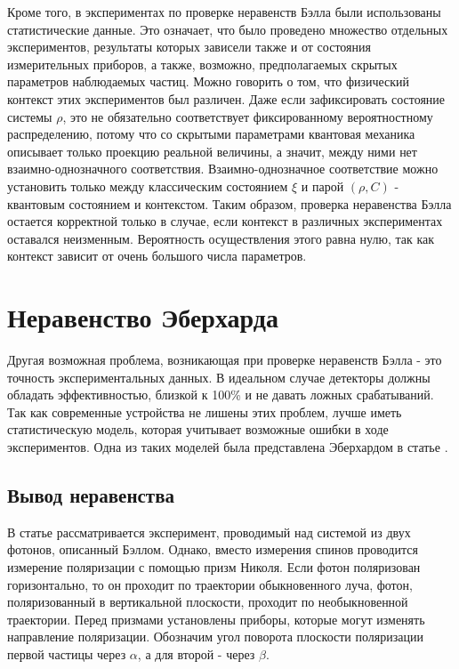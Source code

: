 \documentclass[%
master,         %
subf,           %
href,           %
,times         %
]{disser}
\numberwithin{equation}{section}
\numberwithin{figure}{section}
\begin{document}
Кроме того, в экспериментах по проверке неравенств Бэлла были использованы статистические данные. Это означает, что было проведено множество отдельных экспериментов, результаты которых зависели также и от состояния измерительных приборов, а также, возможно, предполагаемых скрытых параметров наблюдаемых частиц. Можно говорить о том, что физический контекст этих экспериментов был различен. Даже если зафиксировать состояние системы $\rho$, это не обязательно соответствует фиксированному вероятностному распределению, потому что со скрытыми параметрами квантовая механика описывает только проекцию реальной величины, а значит, между ними нет взаимно-однозначного соответствия. Взаимно-однозначное соответствие можно установить только между классическим состоянием $\xi$  и парой $(\rho, C)$ - квантовым состоянием и контекстом. Таким образом, проверка неравенства Бэлла остается корректной только в случае, если контекст в различных экспериментах оставался неизменным. Вероятность осуществления этого равна нулю, так как контекст зависит от очень большого числа параметров.

\section{Неравенство Эберхарда}
Другая возможная проблема, возникающая при проверке неравенств Бэлла - это точность экспериментальных данных. В идеальном случае детекторы должны обладать эффективностью, близкой к 100\% и не давать ложных срабатываний. Так как современные устройства не лишены этих проблем, лучше иметь статистическую модель, которая учитывает возможные ошибки в ходе экспериментов. Одна из таких моделей была представлена Эберхардом в статье \cite{Eberhard}.

\subsection{Вывод неравенства}

В статье рассматривается эксперимент, проводимый над системой из двух фотонов, описанный Бэллом. Однако, вместо измерения спинов проводится измерение поляризации с помощью призм Николя. Если фотон поляризован горизонтально, то он проходит по траектории обыкновенного луча, фотон, поляризованный в вертикальной плоскости, проходит по необыкновенной траектории. Перед призмами установлены приборы, которые могут изменять направление поляризации. Обозначим угол поворота плоскости поляризации первой частицы через $\alpha$, а для второй - через $\beta$.
\end{document}
